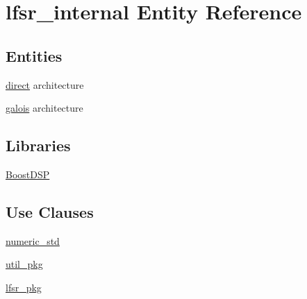 \hypertarget{classlfsr__internal}{\section{lfsr\-\_\-internal Entity Reference}
\label{classlfsr__internal}
}
\subsection*{Entities}
\begin{DoxyCompactItemize}
\item 
\hyperlink{classlfsr__internal_1_1direct}{direct} architecture
\item 
\hyperlink{classlfsr__internal_1_1galois}{galois} architecture
\end{DoxyCompactItemize}
\subsection*{Libraries}
 \begin{DoxyCompactItemize}
\item 
\hypertarget{classlfsr__internal_af4aebbb5387a0e68735d64561e96bb77}{\hyperlink{classlfsr__internal_af4aebbb5387a0e68735d64561e96bb77}{Boost\-D\-S\-P} }\label{classlfsr__internal_af4aebbb5387a0e68735d64561e96bb77}

\end{DoxyCompactItemize}
\subsection*{Use Clauses}
 \begin{DoxyCompactItemize}
\item 
\hypertarget{classlfsr__internal_a2edc34402b573437d5f25fa90ba4013e}{\hyperlink{classlfsr__internal_a2edc34402b573437d5f25fa90ba4013e}{numeric\-\_\-std}   }\label{classlfsr__internal_a2edc34402b573437d5f25fa90ba4013e}

\item 
\hypertarget{classlfsr__internal_a4aaca332b2340a63e969ac63f1ba3e5d}{\hyperlink{classlfsr__internal_a4aaca332b2340a63e969ac63f1ba3e5d}{util\-\_\-pkg}   }\label{classlfsr__internal_a4aaca332b2340a63e969ac63f1ba3e5d}

\item 
\hypertarget{classlfsr__internal_adb085513a5228f37a5a2d9e04d8bdf76}{\hyperlink{classlfsr__internal_adb085513a5228f37a5a2d9e04d8bdf76}{lfsr\-\_\-pkg}   }\label{classlfsr__internal_adb085513a5228f37a5a2d9e04d8bdf76}

\end{DoxyCompactItemize}
